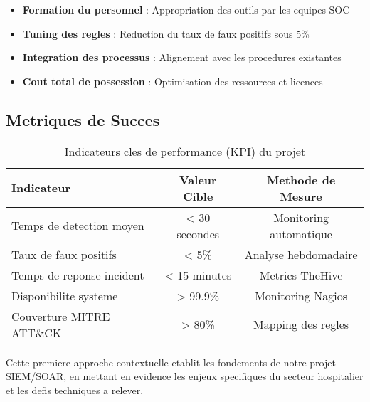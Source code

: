 \begin{itemize}
    \item \textbf{Formation du personnel} : Appropriation des outils par les equipes SOC
    \item \textbf{Tuning des regles} : Reduction du taux de faux positifs sous 5\%
    \item \textbf{Integration des processus} : Alignement avec les procedures existantes
    \item \textbf{Cout total de possession} : Optimisation des ressources et licences
\end{itemize}

\subsection{Metriques de Succes}

\begin{table}[H]
    \centering
    \caption{Indicateurs cles de performance (KPI) du projet}
    \begin{tabular}{|l|c|c|}
        \hline
        \textbf{Indicateur}       & \textbf{Valeur Cible} & \textbf{Methode de Mesure} \\
        \hline
        Temps de detection moyen  & < 30 secondes         & Monitoring automatique     \\
        \hline
        Taux de faux positifs     & < 5\%                 & Analyse hebdomadaire       \\
        \hline
        Temps de reponse incident & < 15 minutes          & Metrics TheHive            \\
        \hline
        Disponibilite systeme     & > 99.9\%              & Monitoring Nagios          \\
        \hline
        Couverture MITRE ATT\&CK  & > 80\%                & Mapping des regles         \\
        \hline
    \end{tabular}
\end{table}

Cette premiere approche contextuelle etablit les fondements de notre projet SIEM/SOAR, en mettant en evidence les enjeux specifiques du secteur hospitalier et les defis techniques a relever.
